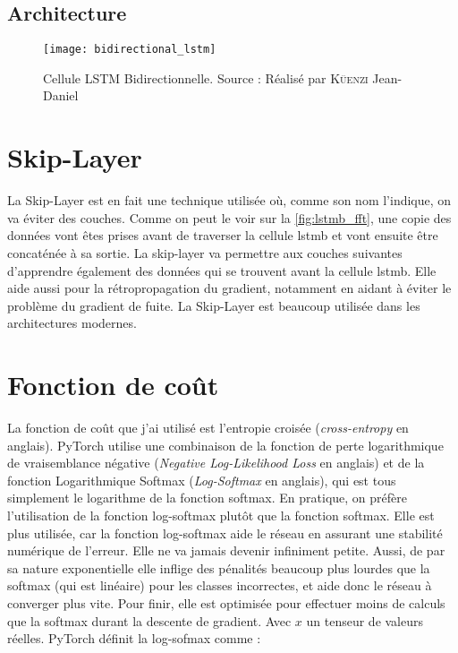 \subsection{Architecture}

\begin{figure}[H]
	\centering
	\texttt{[image: bidirectional\_lstm]}
	\caption[Cellule LSTM Bidirectionnelle]{Cellule LSTM Bidirectionnelle. Source : Réalisé par \textsc{Küenzi} Jean-Daniel}
	\label{fig:bidirectional_lstm}
\end{figure}

\section{Skip-Layer}
\label{sec:5.7}

La Skip-Layer est en fait une technique utilisée où, comme son nom l'indique, on va éviter des couches. Comme on peut le voir sur la \autoref{fig:lstmb_fft}, une copie des données vont êtes prises avant de traverser la cellule \gls{lstmb} et vont ensuite être concaténée à sa sortie. La skip-layer va permettre aux couches suivantes d'apprendre également des données qui se trouvent avant la cellule \gls{lstmb}. Elle aide aussi pour la rétropropagation du gradient, notamment en aidant à éviter le problème du gradient de fuite. La Skip-Layer est beaucoup utilisée dans les architectures modernes.

\section{Fonction de coût}
\label{sec:5.8}

La fonction de coût que j'ai utilisé est l'entropie croisée (\textit{cross-entropy} en anglais). PyTorch \parencite{noauthor_crossentropyloss_nodate} utilise une combinaison de la fonction de perte logarithmique de vraisemblance négative (\textit{Negative Log-Likelihood Loss} en anglais) et de la fonction Logarithmique Softmax (\textit{Log-Softmax} en anglais), qui est tous simplement le logarithme de la fonction softmax. En pratique, on préfère l'utilisation de la fonction log-softmax plutôt que la fonction softmax. Elle est plus utilisée, car la fonction log-softmax aide le réseau en assurant une stabilité numérique de l'erreur. Elle ne va jamais devenir infiniment petite. Aussi, de par sa nature exponentielle elle inflige des pénalités beaucoup plus lourdes que la softmax (qui est linéaire) pour les classes incorrectes, et aide donc le réseau à converger plus vite. Pour finir, elle est optimisée pour effectuer moins de calculs que la softmax durant la descente de gradient. Avec $x$ un tenseur de valeurs réelles. PyTorch définit la log-sofmax comme :


